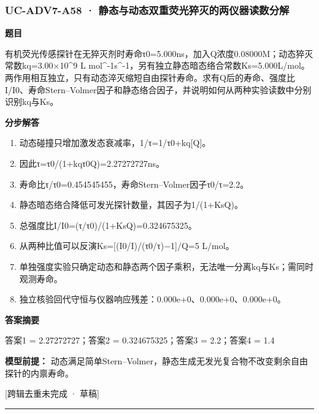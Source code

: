 \documentclass[UTF8,11pt,a4paper]{ctexart}
\begin{document}
\subsubsection*{UC-ADV7-A58 · 静态与动态双重荧光猝灭的两仪器读数分解}
\noindent\textbf{题目}\par
有机荧光传感探针在无猝灭剂时寿命τ0=5.000ns，加入Q浓度0.08000M；动态猝灭常数kq=3.00×10\textasciicircum{}9 L mol\textasciicircum{}-1s\textasciicircum{}-1，另有独立静态暗态络合常数Ks=5.000L/mol。两作用相互独立，只有动态淬灭缩短自由探针寿命。求有Q后的寿命、强度比I/I0、寿命Stern–Volmer因子和静态络合因子，并说明如何从两种实验读数中分别识别kq与Ks。\par
\medskip\noindent\textbf{分步解答}
\begin{enumerate}
\item 动态碰撞只增加激发态衰减率，1/τ=1/τ0+kq[Q]。
\item 因此τ=τ0/(1+kqτ0Q)=2.27272727ns。
\item 寿命比τ/τ0=0.454545455，寿命Stern–Volmer因子τ0/τ=2.2。
\item 静态暗态络合降低可发光探针数量，其因子为1/(1+KsQ)。
\item 总强度比I/I0=(τ/τ0)/(1+KsQ)=0.324675325。
\item 从两种比值可以反演Ks=[(I0/I)/(τ0/τ)−1]/Q=5 L/mol。
\item 单独强度实验只确定动态和静态两个因子乘积，无法唯一分离kq与Ks；需同时观测寿命。
\item 独立核验回代守恒与仪器响应残差：0.000e+0、0.000e+0、0.000e+0。
\end{enumerate}
\noindent\textbf{答案摘要}\par
答案1 = 2.27272727；答案2 = 0.324675325；答案3 = 2.2；答案4 = 1.4\par
\noindent\textbf{模型前提：}
动态满足简单Stern–Volmer，静态生成无发光复合物不改变剩余自由探针的内禀寿命。\par
\noindent\textcolor{red!65!black}{[跨辑去重未完成 · 草稿]} \par
\medskip\hrule\medskip
{}
\end{document}
